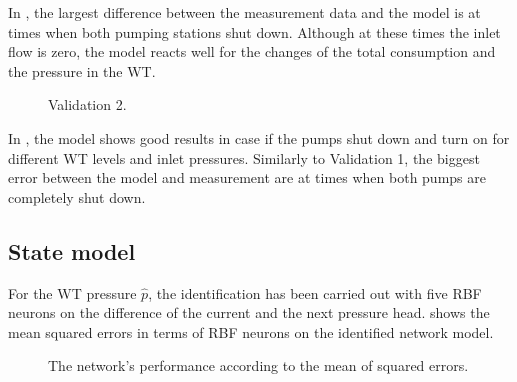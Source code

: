  \vspace{-4mm}

 In , the largest difference between the measurement data and the model is at times when both pumping stations shut down. Although at these times the inlet flow is zero, the model reacts well for the changes of the total consumption and the pressure in the WT.

  \vspace{-2mm}

 \begin{figure}[H]
 \centering
  
 \vspace{-2.5mm}
 \caption{Validation 2.}
 \label{fig:pk_v2_ident}
 \end{figure}

 \vspace{-4mm}

In , the model shows good results in case if the pumps shut down and turn on for different WT levels and inlet pressures. Similarly to Validation 1, the biggest error between the model and measurement are at times when both pumps are completely shut down. 

 \subsection{State model}
 \label{state_model}

For the WT pressure $\hat{p}$, the identification has been carried out with five RBF neurons on the difference of the current and the next pressure head. shows the mean squared errors in terms of RBF neurons on the identified network model.

\vspace{-1mm}

 \begin{figure}[H]
 \centering
  
 \vspace{-3.5mm}
 \caption{The network’s performance according to the mean of squared errors.}
 \label{fig:MSE_state}
 \end{figure}

 \vspace{-3mm}


